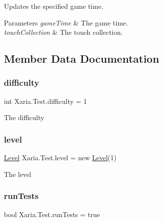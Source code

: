 Updates the specified game time. 


\begin{DoxyParams}{Parameters}
{\em game\+Time} & The game time.\\
\hline
{\em touch\+Collection} & The touch collection.\\
\hline
\end{DoxyParams}


\subsection{Member Data Documentation}
\mbox{\label{classXaria_1_1Test_a26123efa80dd7b2239686616e87ee20d}} 
\subsubsection{\texorpdfstring{difficulty}{difficulty}}
{\footnotesize\ttfamily int Xaria.\+Test.\+difficulty = 1\hspace{0.3cm}{\ttfamily [private]}}



The difficulty 

\mbox{\label{classXaria_1_1Test_a00af721eecb1813fba1f30afec4044b9}} 
\subsubsection{\texorpdfstring{level}{level}}
{\footnotesize\ttfamily \hyperlink{classXaria_1_1Level}{Level} Xaria.\+Test.\+level = new \hyperlink{classXaria_1_1Level}{Level}(1)\hspace{0.3cm}{\ttfamily [private]}}



The level 

\mbox{\label{classXaria_1_1Test_ac119e60fe2a56444b7c8673591328611}} 
\subsubsection{\texorpdfstring{run\+Tests}{runTests}}
{\footnotesize\ttfamily bool Xaria.\+Test.\+run\+Tests = true\hspace{0.3cm}{\ttfamily [private]}}



